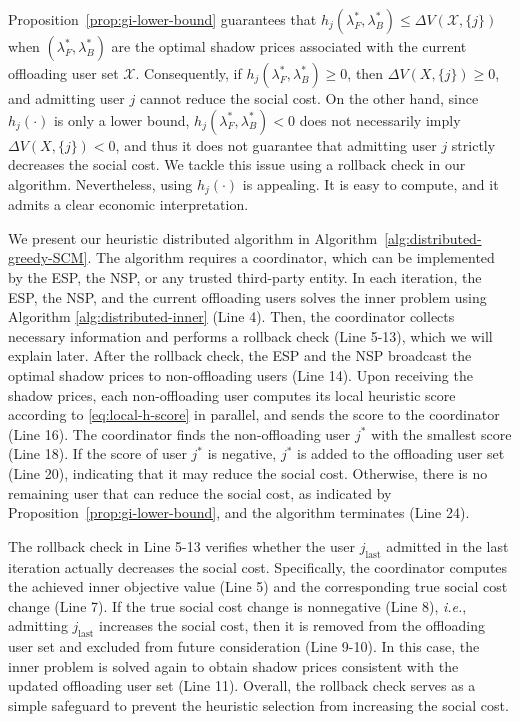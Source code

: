 \documentclass[lettersize,journal]{IEEEtran}
\newcommand{\ie}{\emph{i.e.}}
\begin{document}
Proposition~\ref{prop:gi-lower-bound} guarantees that $h_j(\lambda_F^*,\lambda_B^*)\le \Delta V(\mathcal{X},\{j\})$ when $(\lambda_F^*,\lambda_B^*)$ are the optimal shadow prices associated with the current
offloading user set $\mathcal{X}$.
Consequently, if $h_j(\lambda_F^*,\lambda_B^*)\ge 0$, then $\Delta V(X,\{j\})\ge 0$, and admitting user $j$ cannot reduce the social cost.
On the other hand, since $h_j(\cdot)$ is only a lower bound, $h_j(\lambda_F^*,\lambda_B^*)<0$ does not necessarily imply
$\Delta V(X,\{j\})<0$, and thus it does not guarantee that admitting user $j$ strictly decreases the social cost. We tackle this issue using a rollback check in our algorithm.
Nevertheless, using $h_j(\cdot)$ is appealing. It is easy to compute, and it admits a clear economic
interpretation.

We present our heuristic distributed algorithm in Algorithm~\ref{alg:distributed-greedy-SCM}. The algorithm requires a coordinator, which can be implemented by the ESP, the NSP, or any trusted third-party entity. In each iteration, the ESP, the NSP, and the current offloading users solves the inner problem using Algorithm \ref{alg:distributed-inner} (Line 4). 
Then, the coordinator collects necessary information and performs a rollback check (Line 5-13), which we will explain later.
After the rollback check, the ESP and the NSP broadcast the optimal shadow prices to non-offloading users (Line 14). Upon receiving the shadow prices, each non-offloading user computes its local heuristic score according to \eqref{eq:local-h-score} in parallel, and sends the score to the coordinator (Line 16). The coordinator finds the non-offloading user $j^*$ with the smallest score (Line 18). If the score of user $j^*$ is negative, $j^*$ is added to the offloading user set (Line 20), indicating that it may reduce the social cost. Otherwise, there is no remaining user that can reduce the social cost, as indicated by Proposition~\ref{prop:gi-lower-bound}, and the algorithm terminates (Line 24). 

The rollback check in Line 5-13 verifies whether the user $j_{\text{last}}$ admitted in the last iteration actually decreases the social cost. Specifically, the coordinator computes the achieved inner objective value (Line 5) and the corresponding true social cost change (Line 7). If the true social cost change is nonnegative (Line 8), \ie, admitting $j_{\text{last}}$ increases the social cost, then it is removed from the offloading user set and excluded from future consideration (Line 9-10). In this case, the inner problem is solved again to obtain shadow prices consistent with the updated offloading user set (Line 11). Overall, the rollback check serves as a simple safeguard to prevent the heuristic selection from increasing the social cost.
\end{document}
